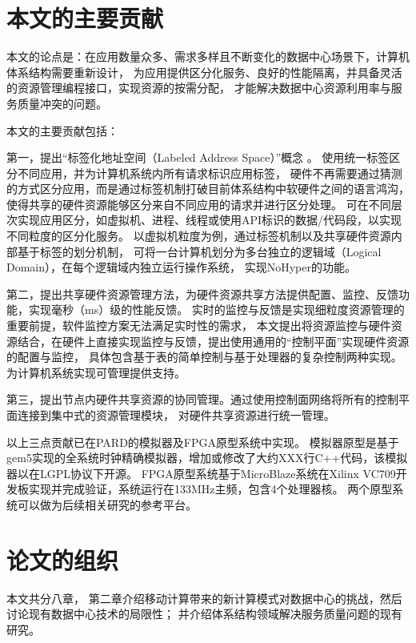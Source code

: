 \section{本文的主要贡献}

本文的论点是：在应用数量众多、需求多样且不断变化的数据中心场景下，计算机体系结构需要重新设计，
为应用提供区分化服务、良好的性能隔离，并具备灵活的资源管理编程接口，实现资源的按需分配，
才能解决数据中心资源利用率与服务质量冲突的问题。

本文的主要贡献包括：

第一，提出“标签化地址空间（Labeled Address Space）”概念 。
使用统一标签区分不同应用，并为计算机系统内所有请求标识应用标签，
硬件不再需要通过猜测的方式区分应用，而是通过标签机制打破目前体系结构中软硬件之间的语言鸿沟，
使得共享的硬件资源能够区分来自不同应用的请求并进行区分处理。
可在不同层次实现应用区分，如虚拟机、进程、线程或使用API标识的数据/代码段，以实现不同粒度的区分化服务。
以虚拟机粒度为例，通过标签机制以及共享硬件资源内部基于标签的划分机制，
可将一台计算机划分为多台独立的逻辑域（Logical Domain），在每个逻辑域内独立运行操作系统，
实现NoHyper\cite{nohype2012}的功能。

第二，提出共享硬件资源管理方法，为硬件资源共享方法提供配置、监控、反馈功能，实现毫秒（ms）级的性能反馈。
实时的监控与反馈是实现细粒度资源管理的重要前提，软件监控方案无法满足实时性的需求，
本文提出将资源监控与硬件资源结合，在硬件上直接实现监控与反馈，提出使用通用的“控制平面”实现硬件资源的配置与监控，
具体包含基于表的简单控制与基于处理器的复杂控制两种实现。为计算机系统实现可管理提供支持。

第三，提出节点内硬件共享资源的协同管理。通过使用控制面网络将所有的控制平面连接到集中式的资源管理模块，
对硬件共享资源进行统一管理。

以上三点贡献已在PARD的模拟器及FPGA原型系统中实现。
模拟器原型是基于gem5实现的全系统时钟精确模拟器，增加或修改了大约XXX行C++代码，该模拟器以在LGPL协议下开源。
FPGA原型系统基于MicroBlaze系统在Xilinx VC709开发板实现并完成验证，系统运行在133MHz主频，包含4个处理器核。
两个原型系统可以做为后续相关研究的参考平台。


\section{论文的组织}

本文共分八章，
第二章介绍移动计算带来的新计算模式对数据中心的挑战，然后讨论现有数据中心技术的局限性；
并介绍体系结构领域解决服务质量问题的现有研究。

